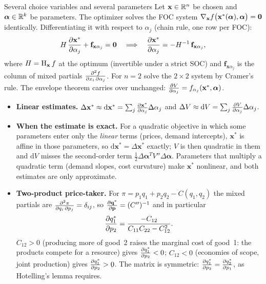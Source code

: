 \begin{rulebox}{Several choice variables and several parameters}
Let $\mathbf{x}\in\mathbb{R}^{n}$ be chosen and $\boldsymbol{\alpha}\in\mathbb{R}^{k}$ be
parameters. The optimizer solves the FOC system
$\nabla_{\mathbf{x}}f\bigl(\mathbf{x}^*(\boldsymbol{\alpha}),\boldsymbol{\alpha}\bigr)
=\mathbf{0}$ identically. Differentiating it with respect to $\alpha_j$
(chain rule, one row per FOC):
\[
  H\,\frac{\partial \mathbf{x}^*}{\partial \alpha_j}+\mathbf{f}_{\mathbf{x}\alpha_j}=\mathbf{0}
  \quad\Longrightarrow\quad
  \frac{\partial \mathbf{x}^*}{\partial \alpha_j}=-H^{-1}\,\mathbf{f}_{\mathbf{x}\alpha_j},
\]
where $H=\operatorname{H}_{\mathbf{x}}f$ at the optimum (invertible under a strict
SOC) and $\mathbf{f}_{\mathbf{x}\alpha_j}$ is the column of mixed partials
$\frac{\partial^{2} f}{\partial x_i\,\partial \alpha_j}$. For $n=2$ solve the $2\times2$ system by Cramer's
rule. The envelope theorem carries over unchanged:
$\frac{\partial V}{\partial \alpha_j}=f_{\alpha_j}(\mathbf{x}^*,\boldsymbol{\alpha})$.
\begin{itemize}[leftmargin=1.6em,itemsep=0.3ex]
  \item \textbf{Linear estimates.}
        $\Delta\mathbf{x}^*\approx\mathrm{d}\mathbf{x}^*
        =\sum_j\frac{\partial \mathbf{x}^*}{\partial \alpha_j}\Delta\alpha_j$ and
        $\Delta V\approx\mathrm{d}V=\sum_j\frac{\partial V}{\partial \alpha_j}\Delta\alpha_j$.
  \item \textbf{When the estimate is exact.} For a quadratic objective in
        which some parameters enter only the \emph{linear} terms (prices,
        demand intercepts), $\mathbf{x}^*$ is affine in those parameters, so
        $\mathrm{d}\mathbf{x}^*=\Delta\mathbf{x}^*$ exactly; $V$ is then
        quadratic in them and $\mathrm{d}V$ misses the second-order term
        $\tfrac12\Delta\boldsymbol{\alpha}^{T}V''\Delta\boldsymbol{\alpha}$.
        Parameters that multiply a quadratic term (demand slopes, cost
        curvature) make $\mathbf{x}^*$ nonlinear, and both estimates are only
        approximate.
  \item \textbf{Two-product price-taker.} For
        $\pi=p_1q_1+p_2q_2-C(q_1,q_2)$ the mixed partials are
        $\frac{\partial^{2} \pi}{\partial q_i\,\partial p_j}=\delta_{ij}$, so
        $\frac{\partial \mathbf{q}^*}{\partial \mathbf{p}}=(C'')^{-1}$ and in particular
        \[
          \frac{\partial q_1^*}{\partial p_2}=\frac{-C_{12}}{C_{11}C_{22}-C_{12}^{2}} .
        \]
        $C_{12}>0$ (producing more of good~2 raises the marginal cost of
        good~1: the products compete for a resource) gives
        $\frac{\partial q_1^*}{\partial p_2}<0$; $C_{12}<0$ (economies of scope, joint
        production) gives $\frac{\partial q_1^*}{\partial p_2}>0$. The matrix is symmetric:
        $\frac{\partial q_1^*}{\partial p_2}=\frac{\partial q_2^*}{\partial p_1}$, as Hotelling's lemma requires.
\end{itemize}
\end{rulebox}

